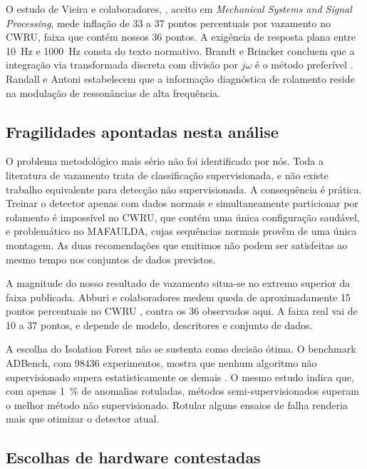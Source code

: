 \documentclass[11pt,a4paper]{article}
\begin{document}
O estudo de Vieira e colaboradores, \cite{vieira2026}, aceito em \emph{Mechanical Systems and Signal
Processing}, mede inflação de \num{33} a \num{37} pontos percentuais por vazamento no CWRU,
faixa que contém nossos \num{36} pontos. A exigência de resposta plana entre
\SI{10}{\hertz} e \SI{1000}{\hertz} consta do texto normativo. Brandt e Brincker concluem
que a integração via transformada discreta com divisão por $j\omega$ é o método preferível
\cite{brandt2014}.
Randall e Antoni \cite{randall2011} estabelecem que a informação diagnóstica de rolamento reside na modulação
de ressonâncias de alta frequência.

\subsection{Fragilidades apontadas nesta análise}
\label{ssec:frag}

O problema metodológico mais sério não foi identificado por nós. Toda a literatura de
vazamento trata de classificação supervisionada, e não existe trabalho equivalente para
detecção não supervisionada. A consequência é prática. Treinar o detector apenas com
dados normais e simultaneamente particionar por rolamento é impossível no CWRU, que
contém uma única configuração saudável, e problemático no MAFAULDA, cujas sequências
normais provêm de uma única montagem. As duas recomendações que emitimos não podem ser
satisfeitas ao mesmo tempo nos conjuntos de dados previstos.

A magnitude do nosso resultado de vazamento situa-se no extremo superior da faixa
publicada. Abburi e colaboradores medem queda de aproximadamente \num{15} pontos
percentuais no CWRU \cite{abburi2023}, contra os \num{36} observados aqui. A faixa real vai de \num{10} a
\num{37} pontos, e depende de modelo, descritores e conjunto de dados.

A escolha do Isolation Forest não se sustenta como decisão ótima. O benchmark ADBench,
com \num{98436} experimentos, mostra que nenhum algoritmo não supervisionado supera
estatisticamente os demais \cite{han2022}. O mesmo estudo indica que, com apenas \SI{1}{\percent} de
anomalias rotuladas, métodos semi-supervisionados superam o melhor método não
supervisionado. Rotular alguns ensaios de falha renderia mais que otimizar o detector
atual.

\subsection{Escolhas de hardware contestadas}
\label{ssec:hw}
\end{document}
